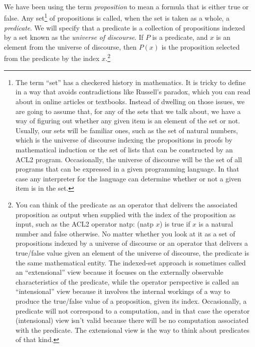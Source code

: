 {{\label{proposition-def}
We have been using the term \emph{proposition} to mean a formula that is either true or false.
\label{predicate-def}
Any set\footnote{The
term 
``set'' has a checkered history in mathematics.
It is tricky to define in a way that avoids contradictions
like Russell's paradox, which you can read about
in online articles or textbooks.
Instead of dwelling on those issues,
we are going to assume that,
for any of the sets that we talk about,
we have a way of figuring out whether any given
item is an element of the set or not.
Usually, our sets will be familiar ones,
such as the set of natural numbers, which
is the universe of discourse indexing the propositions
in proofs by mathematical induction or
the set of lists that can be constructed
by an ACL2 program.
Occasionally, the universe of discourse will be
the set of all programs that can be expressed in a given
programming language.
In that case
any interpreter for the language
can determine whether or
not a given item is in the set.}
of propositions is called,
when the set is taken as a whole, a \emph{predicate}.
We will specify that a predicate 
is a collection of propositions
indexed by a set known as the
\label{def-universe-of-discourse}
\emph{universe of discourse}.
If $P$ is a predicate, and $x$ is an element from
the universe of discourse, then $P(x)$ is
the proposition 
selected from the predicate by the index $x$.\footnote{You
can think of the predicate as an
operator that delivers the associated proposition as output
when supplied with the index of the proposition as input,
such as the ACL2 operator natp: (natp $x$) is true if
$x$ is a natural number and false otherwise.
No matter whether you look at it as a set of propositions
indexed by a universe of discourse or an operator that
delivers a true/false value given an element of the universe of discourse,
the predicate is the same mathematical entity.
The indexed-set approach is sometimes called an ``extensional'' view
because it focuses on the externally observable characteristics of the predicate,
while the operator perspective is called an ``intensional'' view 
because it involves the internal workings of a way to produce the true/false value
of a proposition, given its index.
Occasionally, a predicate will not correspond to a computation,
and in that case the operator (intensional) view
isn't valid because there will be no
computation associated with the predicate.
The extensional view is the way
to think about predicates of that kind.}
}

}
